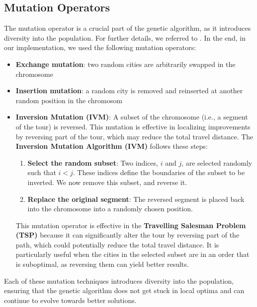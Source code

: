 \documentclass[12pt]{article}
\begin{document}
\begin{enumerate}
\subsection{Mutation Operators}
The mutation operator is a crucial part of the genetic algorithm, as it introduces diversity into the population. For further details, we referred to \cite{Larranaga1999}. In the end, in our implementation, we used the following mutation operators:

\begin{itemize}
    \item \textbf{Exchange mutation}: two random cities are arbitrarily swapped in the chromosome
    \item \textbf{Insertion mutation}: a random city is removed and reinserted at another random position in the chromosom
    \item \textbf{Inversion Mutation (IVM)}: A subset of the chromosome (i.e., a segment of the tour) is reversed. This mutation is effective in localizing improvements by reversing part of the tour, which may reduce the total travel distance. The \textbf{Inversion Mutation Algorithm (IVM)} follows these steps:
    
    \begin{enumerate}
        \item \textbf{Select the random subset}: Two indices, $i$ and $j$, are selected randomly such that $i < j$. These indices define the boundaries of the subset to be inverted. We now remove this subset, and reverse it. 
        
        \item \textbf{Replace the original segment}: The reversed segment is placed back into the chromosome into a randomly chosen position. 
    \end{enumerate}

    \noindent This mutation operator is effective in the \textbf{Travelling Salesman Problem (TSP)} because it can significantly alter the tour by reversing part of the path, which could potentially reduce the total travel distance. It is particularly useful when the cities in the selected subset are in an order that is suboptimal, as reversing them can yield better results.
\end{itemize}


Each of these mutation techniques introduces diversity into the population, ensuring that the genetic algorithm does not get stuck in local optima and can continue to evolve towards better solutions.



\end{enumerate}
\end{document}
